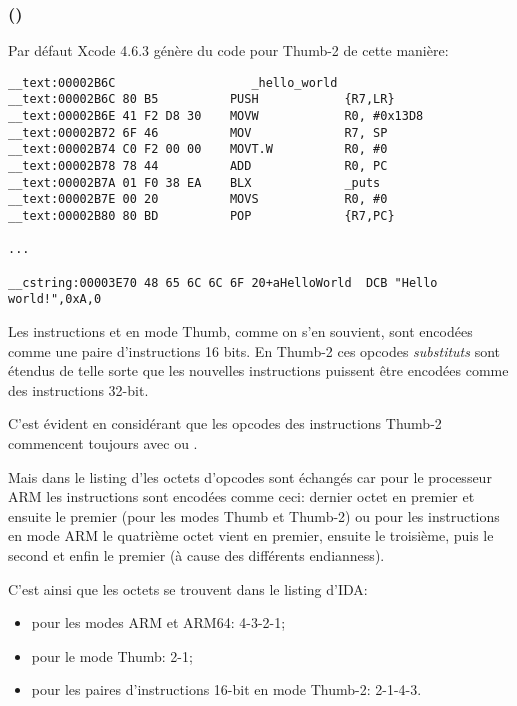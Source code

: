 \subsubsection{\OptimizingXcodeIV (\ThumbTwoMode)}

Par défaut Xcode 4.6.3 génère du code pour Thumb-2 de cette manière:

\begin{lstlisting}[caption=\OptimizingXcodeIV (\ThumbTwoMode),style=customasmARM]
__text:00002B6C                   _hello_world
__text:00002B6C 80 B5          PUSH            {R7,LR}
__text:00002B6E 41 F2 D8 30    MOVW            R0, #0x13D8
__text:00002B72 6F 46          MOV             R7, SP
__text:00002B74 C0 F2 00 00    MOVT.W          R0, #0
__text:00002B78 78 44          ADD             R0, PC
__text:00002B7A 01 F0 38 EA    BLX             _puts
__text:00002B7E 00 20          MOVS            R0, #0
__text:00002B80 80 BD          POP             {R7,PC}

...

__cstring:00003E70 48 65 6C 6C 6F 20+aHelloWorld  DCB "Hello world!",0xA,0
\end{lstlisting}


\myindex{\ThumbTwoMode}

Les instructions  et  en mode Thumb, comme on s'en souvient, sont
encodées comme une paire d'instructions 16 bits.
En Thumb-2 ces opcodes \emph{substituts} sont étendus de telle sorte que les nouvelles
instructions puissent être encodées comme des instructions 32-bit.

C'est évident en considérant que les opcodes des instructions Thumb-2 commencent
toujours avec  ou .

Mais dans le listing d'\IDA les octets d'opcodes sont échangés car pour le processeur
ARM les instructions sont encodées comme ceci:
dernier octet en premier et ensuite le premier (pour les modes Thumb et Thumb-2)
ou pour les instructions en mode ARM le quatrième octet vient en premier, ensuite
le troisième, puis le second et enfin le premier (à cause des différents \gls{endianness}).

C'est ainsi que les octets se trouvent dans le listing d'IDA:
\begin{itemize}
\item pour les modes ARM et ARM64: 4-3-2-1;
\item pour le mode Thumb: 2-1;
\item pour les paires d'instructions 16-bit en mode Thumb-2: 2-1-4-3.
\end{itemize}

